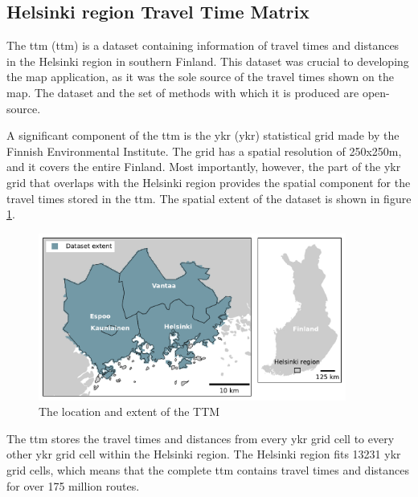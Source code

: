 \subsection{Helsinki region Travel Time Matrix}

The \acrlong{ttm} (\acrshort{ttm}) \parencite{fin2023}
is a dataset containing information of travel times and distances
in the Helsinki region in southern Finland.
This dataset was crucial to developing the map application,
as it was the sole source of the travel times shown on the map.
The dataset and the set of methods with which it is produced are open-source.

A significant component of the \acrshort{ttm} is the \acrlong{ykr} (\acrshort{ykr})
statistical grid made by the Finnish Environmental Institute.
The grid has a spatial resolution of 250x250m, and it covers the entire Finland.
Most importantly, however, the part of the \acrshort{ykr} grid that overlaps with
the Helsinki region provides the spatial component for
the travel times stored in the \acrshort{ttm}.
The spatial extent of the dataset is shown in figure \ref{fig:ttm extent}.

\begin{figure}[H]
	\centering
	\includegraphics[width=0.9\textwidth]{visual/figures/ttm/ttm_extent}
	\caption{The location and extent of the TTM}
	\label{fig:ttm extent}
\end{figure}

The \acrshort{ttm} stores the travel times and distances
from every \acrshort{ykr} grid cell to every other  \acrshort{ykr} grid cell
within the Helsinki region.
The Helsinki region fits 13231 \acrshort{ykr} grid cells,
which means that the complete \acrshort{ttm} contains travel times and distances for
over 175 million routes.

